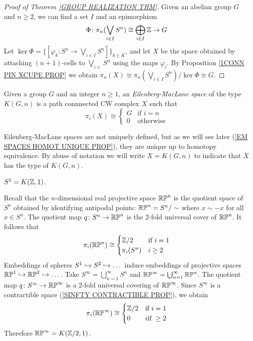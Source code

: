 \begin{proof}[Proof of Theorem \ref{GROUP REALIZATION THM}]
Given an abelian group $G$ and $n\geq 2$, we can find a set $I$ and 
an epimorphism
\[
\Phi \colon \pi_{n}(\bigvee_{i\in I}S^{n}) \cong \bigoplus_{i\in I}{\mathbb Z} \to G 
\]
Let $\ker \Phi = \{[\varphi_{k}\colon S^{n}\to \bigvee_{i\in I}S^{n}]\}_{k\in K}$, 
and let $X$ be the space obtained by attaching $(n+1)$-cells to $\bigvee_{i\in }S^{n}$
using the maps $\varphi_{i}$. By Proposition \ref{1CONN PIN XCUPE PROP} we obtain
$\pi_{n}(X)\cong \pi_{n}(\bigvee_{i\in I}S^{n})/\ker \Phi \cong G$.  
\end{proof}

\begin{definition}
\label{K(G, N) DEF}
Given a group $G$ and an integer $n\geq 1$, an \emph{Eilenberg-MacLane space} 
of the type $K(G, n)$ is a path connnected CW complex $X$ such that 
\[
\pi_{i}(X) \cong 
\begin{cases}
G & \text{if } i = n\\
0 & \text{otherwise}
\end{cases}
\]
\end{definition}

\begin{note}
Eilenberg-MacLane spaces are not uniquely defined, but as we will see later 
(\ref{EM SPACES HOMOT UNIQUE PROP}), 
they are unique up to homotopy equivalence. By abuse of notation we will 
write $X=K(G, n)$ to indicate that $X$ has the type of $K(G, n)$.
\end{note}

\begin{example}
$S^{1} = K({\mathbb Z}, 1)$. 
\end{example}

\begin{example}
Recall that the $n$-dimensional real projective space ${\mathbb R\mathbb P}^{n}$ is the 
quotient space of $S^{n}$ obtained by identifying antipodal points: 
${\mathbb R\mathbb P}^{n} = S^{n}/\sim$ where $x\sim -x$ for all $x\in S^{n}$. The quotient 
map $q\colon S^{n} \to {\mathbb R\mathbb P}^{n}$ is the 2-fold universal cover of ${\mathbb R\mathbb P}^{n}$. 
It follows that 
\[
\pi_{i}({\mathbb R\mathbb P}^{n})
\cong
\begin{cases}
{\mathbb Z}/2 & \text{if } i = 1\\
\pi_{i}(S^{n}) & i\geq 2
\end{cases}
\]
Embeddings of spheres $S^{1} \hookrightarrow S^{2} \hookrightarrow \dots$ induce embeddings of 
projective spaces ${\mathbb R\mathbb P}^{1} \hookrightarrow {\mathbb R\mathbb P}^{2} \hookrightarrow \dots$. Take 
$S^{\infty} = \bigcup_{n=1}^{\infty} S^{n}$ and 
${\mathbb R\mathbb P}^{\infty} = \bigcup_{n=1}^{\infty} {\mathbb R\mathbb P}^{n}$. The quotient map 
$q\colon S^{\infty} \to {\mathbb R\mathbb P}^{\infty}$ is a 2-fold universal covering of ${\mathbb R\mathbb P}^{\infty}$. 
Since $S^{\infty}$ is a contractible space (\ref{SINFTY CONTRACTIBLE PROP}), we obtain 
\[
\pi_{i}({\mathbb R\mathbb P}^{\infty})
\cong
\begin{cases}
{\mathbb Z}/2 & \text{if } i = 1\\
0 & i \text{if } \geq 2
\end{cases}
\]
Therefore ${\mathbb R\mathbb P}^{\infty} = K({\mathbb Z}/2, 1)$. 
\end{example}

